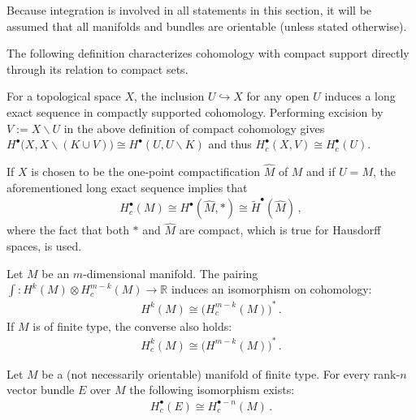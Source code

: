     Because integration is involved in all statements in this section, it will be assumed that all manifolds and bundles are orientable (unless stated otherwise).

    The following definition characterizes cohomology with compact support directly through its relation to compact sets.
    \begin{property}\label{bundle:reduced_compact_cohomology}
        For a topological space $X$, the inclusion $U\hookrightarrow X$ for any open $U$ induces a long exact sequence in compactly supported cohomology. Performing excision by $V:=X\backslash U$ in the above definition of compact cohomology gives $H^\bullet\bigl(X,X\backslash (K\cup V)\bigr)\cong H^\bullet(U,U\backslash K)$ and thus $H^\bullet_c(X,V)\cong H^\bullet_c(U)$.

        If $X$ is chosen to be the one-point compactification $\widehat{M}$ of $M$ and if $U=M$, the aforementioned long exact sequence implies that
        \begin{gather}
            H^\bullet_c(M)\cong H^\bullet(\widehat{M}, \ast)\cong\widetilde{H}^\bullet(\widehat{M})\,,
        \end{gather}
        where the fact that both $\ast$ and $\widehat{M}$ are compact, which is true for Hausdorff spaces, is used.
    \end{property}

    \begin{theorem}\label{bundle:poincare_duality}
        Let $M$ be an $m$-dimensional manifold. The pairing $\int:H^k(M)\otimes H^{m-k}_c(M)\rightarrow\mathbb{R}$ induces an isomorphism on cohomology:
        \begin{gather}
            H^k(M)\cong\bigl(H^{m-k}_c(M)\bigr)^*\,.
        \end{gather}
        If $M$ is of finite type, the converse also holds:
        \begin{gather}
            H^k_c(M)\cong\bigl(H^{m-k}(M)\bigr)^*\,.
        \end{gather}
    \end{theorem}
    \begin{result}
        Let $M$ be a (not necessarily orientable) manifold of finite type. For every rank-$n$ vector bundle $E$ over $M$ the following isomorphism exists:
        \begin{gather}
            H^\bullet_c(E)\cong H^{\bullet-n}_c(M)\,.
        \end{gather}
    \end{result}


